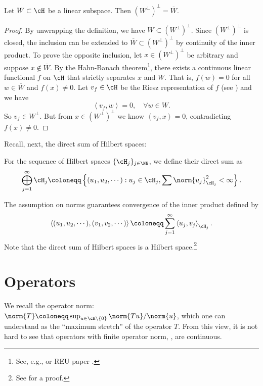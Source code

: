 \documentclass[oneside,reqno,letterpaper]{amsart}
\begin{document}
\begin{proposition}
\label{thm:double-perp}
  Let \(W \subset \cH\) be a linear subspace. 
  Then \((W^\perp)^\perp = \overline{W}\). 
\end{proposition}
\begin{proof}
  By unwrapping the definition, we have \(W \subset (W^\perp)^\perp\). 
  Since \((W^\perp)^\perp\) is closed, the inclusion can be extended to \(\overline{W} \subset (W^\perp)^\perp\) by continuity of the inner product. 
  To prove the opposite inclusion, let \(x \in (W^\perp)^\perp\) be arbitrary and suppose \(x \not\in \overline{W}\). 
  By the Hahn-Banach theorem\footnote{See, e.g., \cite[Chapter 1]{brezis2011functional} or REU paper \cite{peng2014hahn}. }, there exists a continuous linear functional \(f\) on \(\cH\) that strictly separates \(x\) and \(\overline{W}\).
  That is, \(f(w) = 0\) for all \(w \in \overline{W}\) and \(f(x) \neq 0\). 
  Let \(v_f \in \cH\) be the Riesz representation of \(f\) (see ) and we have 
  \[
    \left< v_f, w \right> = 0, \quad \forall w \in W . 
  \] 
  So \(v_f \in W^\perp\). 
  But from \(x \in (W^\perp)^\perp\) we know \(\left< v_f, x \right> = 0\), contradicting \(f(x) \neq 0\). 
\end{proof}


Recall, next, the direct sum of Hilbert spaces:
\begin{definition}
  For the sequence of Hilbert spaces \(\{\cH_j\}_{j \in \NN}\), we define their direct sum as 
  \[
    \bigoplus_{j = 1}^{\infty} \cH_j 
    \coloneqq \left\{ (u_1, u_2, \cdots ): u_j \in \cH_j, \sum \norm{u_j}_{\cH_j}^2 < \infty \right\} . 
  \] 
\end{definition}

The assumption on norms guarantees convergence of the inner product defined by
\[
  \left< (u_1, u_2, \cdots ), (v_1, v_2, \cdots ) \right> \coloneqq \sum_{j =1}^{\infty} \left< u_j, v_j \right>_{\cH_j} . 
\] 
Note that the direct sum of Hilbert spaces is a Hilbert space.\footnote{See \cite[p.~24]{conway2007functional} for a proof. }



\section{Operators}
\label{sec:operators}

We recall the operator norm: \(\norm{T} \coloneqq \sup_{u \in \cH \setminus \{0\}} \norm{T u} / \norm{u}\), which one can understand as the ``maximum stretch'' of the operator \(T\). 
From this view, it is not hard to see that operators with finite operator norm, , are continuous. 
\end{document}
